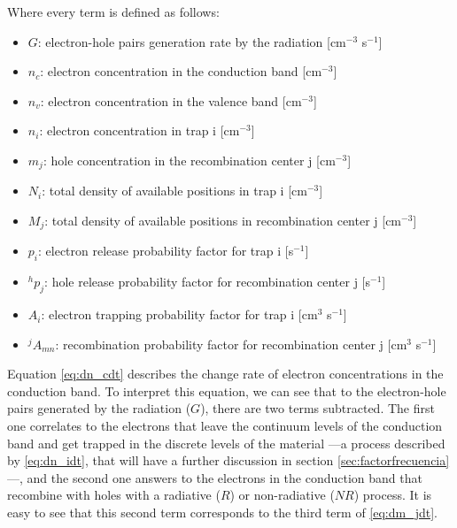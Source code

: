 \vspace{15pt}
Where every term is defined as follows:
\begin{itemize}[itemsep=0.2cm,parsep=0cm]
  \item $G$: electron-hole pairs generation rate by the radiation [cm$^{-3}$ s$^{-1}$]
  \item $n_c$: electron concentration in the conduction band [cm$^{-3}$]
  \item $n_v$: electron concentration in the valence band [cm$^{-3}$]
  \item $n_i$: electron concentration in trap i [cm$^{-3}$]
  \item $m_j$: hole concentration in the recombination center j [cm$^{-3}$]
  \item $N_i$: total density of available positions in trap i [cm$^{-3}$]
  \item $M_j$: total density of available positions in recombination center j [cm$^{-3}$]
  \item $p_i$: electron release probability factor for trap i [s$^{-1}$]
  \item $^hp_j$: hole release probability factor for recombination center j [s$^{-1}$]
  \item $A_i$: electron trapping probability factor for trap i [cm$^{3}$ s$^{-1}$]
  \item $^jA_{mn}$: recombination probability factor for recombination center j [cm$^{3}$ s$^{-1}$]
\end{itemize}

\vspace{10pt}

Equation \ref{eq:dn_cdt} describes the change rate of electron concentrations in the conduction band. To interpret this equation, we can see that to the electron-hole pairs generated by the radiation ($G$), there are two terms subtracted. The first one correlates to the electrons that leave the continuum levels of the conduction band and get trapped in the discrete levels of the material ---a process described by \ref{eq:dn_idt}, that will have a further discussion in section \ref{sec:factorfrecuencia}---, and the second one answers to the electrons in the conduction band that recombine with holes with a radiative ($R$) or non-radiative ($N\!R$) process. It is easy to see that this second term corresponds to the third term of \ref{eq:dm_jdt}. 


